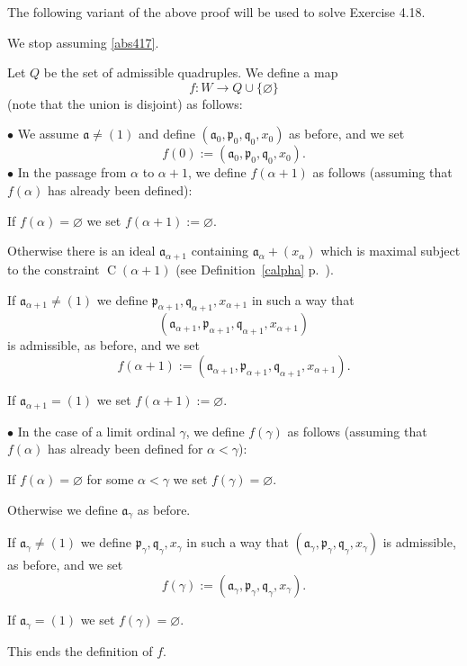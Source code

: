 \documentclass[parskip=half,fontsize=12pt]{scrartcl}%
\newcommand{\oo}{\operatorname}\newcommand{\ooo}{\operatorname*}
\newcommand{\mf}{\mathfrak}
\newcommand{\aaa}{\mf a}
\newcommand{\ppp}{\mf p}
\newcommand{\qqq}{\mf q}
\newcommand{\bu}{\bullet}
\begin{document}
The following variant of the above proof will be used to solve Exercise 4.18. %

We stop assuming \eqref{abs417}. 

Let $Q$ be the set of admissible quadruples. We define a map 
$$
f:W\to Q\cup\{\varnothing\}
$$ 
(note that the union is disjoint) as follows:

$\bu$ We assume $\aaa\ne(1)$ and define $(\aaa_0,\ppp_0,\qqq_0,x_0)$ as before, and we set 
$$
f(0):=(\aaa_0,\ppp_0,\qqq_0,x_0).
$$
$\bu$ In the passage from $\alpha$ to $\alpha+1$, we define $f(\alpha+1)$ as follows (assuming that $f(\alpha)$ has already been defined):

If $f(\alpha)=\varnothing$ we set $f(\alpha+1):=\varnothing$. 

Otherwise there is an ideal $\aaa_{\alpha+1}$ containing $\aaa_\alpha+(x_\alpha)$ which is maximal subject to the constraint $\oo C(\alpha+1)$ (see Definition~\ref{calpha} p.~\pageref{calpha}). 

If $\aaa_{\alpha+1}\ne(1)$ we define $\ppp_{\alpha+1},\qqq_{\alpha+1},x_{\alpha+1}$ in such a way that 
$$
(\aaa_{\alpha+1},\ppp_{\alpha+1},\qqq_{\alpha+1},x_{\alpha+1})
$$ 
is admissible, as before, and we set 
$$
f(\alpha+1):=(\aaa_{\alpha+1},\ppp_{\alpha+1},\qqq_{\alpha+1},x_{\alpha+1}).
$$ 

If $\aaa_{\alpha+1}=(1)$ we set $f(\alpha+1):=\varnothing$.

$\bu$ In the case of a limit ordinal $\gamma$, we define $f(\gamma)$ as follows (assuming that $f(\alpha)$ has already been defined for $\alpha<\gamma$):

If $f(\alpha)=\varnothing$ for some $\alpha<\gamma$ we set $f(\gamma)=\varnothing$.

Otherwise we define $\aaa_\gamma$ as before.

If $\aaa_\gamma\ne(1)$ we define $\ppp_\gamma,\qqq_\gamma,x_\gamma$ in such a way that $(\aaa_\gamma,\ppp_\gamma,\qqq_\gamma,x_\gamma)$ is admissible, as before, and we set 
$$
f(\gamma):=(\aaa_{\gamma},\ppp_{\gamma},\qqq_{\gamma},x_{\gamma}).
$$ 

If $\aaa_\gamma=(1)$ we set $f(\gamma)=\varnothing$.

This ends the definition of $f$.
\end{document}

